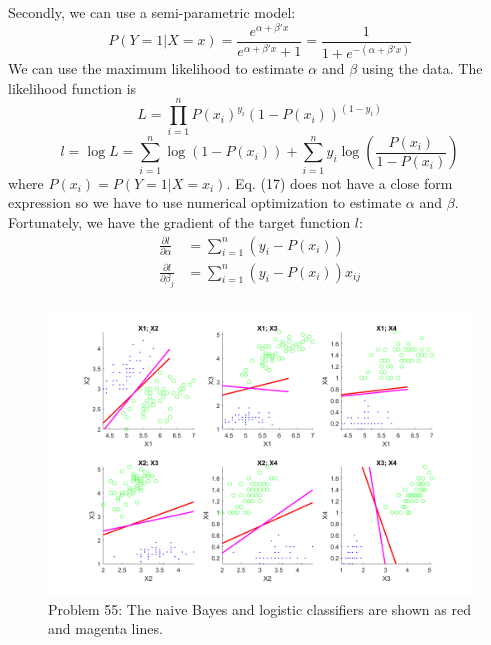 \documentclass[a4paper, 11pt]{article}
\begin{document}
Secondly, we can use a semi-parametric model: 
\begin{equation}
P(Y=1|X=x) = \frac{e^{\alpha+\beta'x}}{e^{\alpha+\beta'x}+1} = \frac{1}{1+e^{-(\alpha+\beta'x)}}
\end{equation}
We can use the maximum likelihood to estimate $\alpha$ and $\beta$ using the data. The likelihood function is
\begin{equation}
L = \prod_{i=1}^nP(x_i)^{y_i}(1-P(x_i))^{(1-y_i)}
\end{equation}
\begin{equation}
l = \log L = \sum_{i=1}^n\log{(1-P(x_i))} + \sum_{i=1}^n y_i\log{\left(\frac{P(x_i)}{1-P(x_i)} \right)}
\end{equation}
where $P(x_i) = P(Y=1|X=x_i)$. Eq. (17) does not have a close form expression so we have to use numerical optimization to estimate $\alpha$ and $\beta$. Fortunately, we have the gradient of the target function $l$:
\begin{equation}
\begin{split}
\frac{\partial l}{\partial \alpha} & = \sum_{i=1}^n (y_i - P(x_i))\\
\frac{\partial l}{\partial \beta_j} & = \sum_{i=1}^n (y_i - P(x_i))x_{ij}\\
\end{split}
\end{equation}

\begin{figure}
	\begin{center}
		\includegraphics[width=6in]{p55.png}
		\caption{Problem 55: The naive Bayes and logistic classifiers are shown as red and magenta lines.}
	\end{center}
\end{figure}
\end{document}
